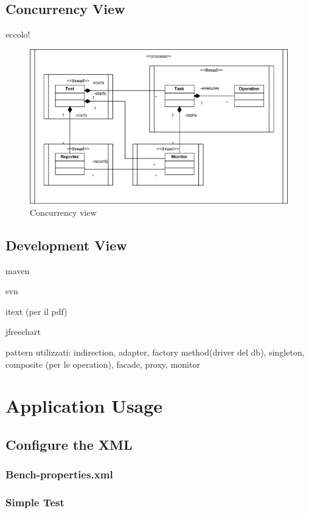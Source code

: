 		\subsection{Concurrency View}
				eccolo!
\begin{figure}[htp!] 
	\begin{center}
		\includegraphics[width=13cm]{img/concorrenza.jpg}	
	\end{center}
	\caption{Concurrency view}
	\label{concurrency-view}	
\end{figure}
		
		\subsection{Development View}
		
		maven
		
		svn
		
		itext (per il pdf)
		
		jfreechart
		
		pattern utilizzati: indirection, adapter, factory method(driver del db), singleton, 
		composite (per le operation), facade, proxy, monitor
	
	\section{Application Usage}
		\subsection{Configure the XML}
			\subsubsection{Bench-properties.xml}
			\subsubsection{Simple Test}
